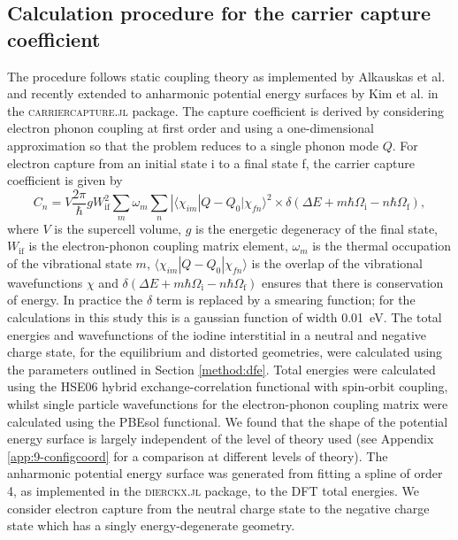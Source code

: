 \subsection{Calculation procedure for the carrier capture coefficient}

The procedure follows static coupling theory as implemented by Alkauskas et al.\autocite{Alkauskas2014} and recently extended to anharmonic potential energy surfaces by Kim et al. in the \textsc{carriercapture.jl} package.\autocite{carriercapture,Kim2019}
The capture coefficient is derived by considering electron phonon coupling at first order and using a one-dimensional approximation so that the problem reduces to a single phonon mode $Q$. For electron capture from an initial state i to a final state f, the carrier capture coefficient is given by
\begin{equation} \label{carriercapteqn}
    C_n = V\frac{2\pi}{\hbar}gW_\textrm{if}^2\sum_m\omega_m\sum_n|\langle\chi_{im}|Q-Q_0|\chi_{fn}\rangle^2\times \delta(\Delta E+m\hbar\Omega_\textrm{i}-n\hbar\Omega_\textrm{f}),
\end{equation}
where $V$ is the supercell volume, $g$ is the energetic degeneracy of the final state, $W_\textrm{if}$ is the electron-phonon coupling matrix element, $\omega_m$ is the thermal occupation of the vibrational state $m$, $\langle\chi_{im}|Q-Q_0|\chi_{fn}\rangle$ is the overlap of the vibrational wavefunctions $\chi$ and $\delta(\Delta E+m\hbar\Omega_\textrm{i}-n\hbar\Omega_\textrm{f})$ ensures that there is conservation of energy. In practice the $\delta$ term is replaced by a smearing function; for the calculations in this study this is a gaussian function of width \SI{0.01}{\electronvolt}.
The total energies and wavefunctions of the iodine interstitial in a neutral and negative charge state, for the equilibrium and distorted geometries, were calculated using the parameters outlined in Section \ref{method:dfe}. Total energies were calculated using the HSE06 hybrid exchange-correlation functional with spin-orbit coupling, whilst single particle wavefunctions for the electron-phonon coupling matrix were calculated using the PBEsol functional.
We found that the shape of the potential energy surface is largely independent of the level of theory used (see Appendix \ref{app:9-configcoord} for a comparison at different levels of theory).
The anharmonic potential energy surface was generated from fitting a spline of order 4, as implemented in the \textsc{dierckx.jl} package,\autocite{dierckx} to the DFT total energies. 
We consider electron capture from the neutral charge state to the negative charge state which has a singly energy-degenerate geometry.

